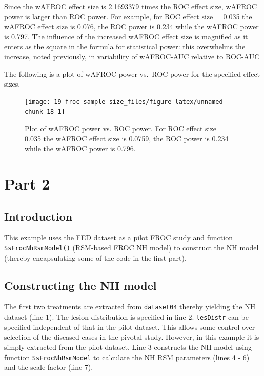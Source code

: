 \documentclass[
]{book}
\begin{document}
Since the wAFROC effect size is 2.1693379 times the ROC effect size, wAFROC power is larger than ROC power. For example, for ROC effect size = 0.035 the wAFROC effect size is 0.076, the ROC power is 0.234 while the wAFROC power is 0.797. The influence of the increased wAFROC effect size is magnified as it enters as the square in the formula for statistical power: this overwhelms the increase, noted previously, in variability of wAFROC-AUC relative to ROC-AUC

The following is a plot of wAFROC power vs.~ROC power for the specified effect sizes.

\begin{figure}

{\centering \texttt{[image: 19-froc-sample-size\_files/figure-latex/unnamed-chunk-18-1]} 

}

\caption{Plot of wAFROC power vs. ROC power. For ROC effect size = 0.035 the wAFROC effect size is 0.0759, the ROC power is 0.234 while the wAFROC power is 0.796.}\label{fig:unnamed-chunk-18}
\end{figure}

\hypertarget{part-2}{%
\section{Part 2}\label{part-2}}

\hypertarget{introduction}{%
\subsection{Introduction}\label{introduction}}

This example uses the FED dataset as a pilot FROC study and function \texttt{SsFrocNhRsmModel()} (RSM-based FROC NH model) to construct the NH model (thereby encapsulating some of the code in the first part).

\hypertarget{constructing-the-nh-model}{%
\subsection{Constructing the NH model}\label{constructing-the-nh-model}}

The first two treatments are extracted from \texttt{dataset04} thereby yielding the NH dataset (line 1). The lesion distribution is specified in line 2. \texttt{lesDistr} can be specified independent of that in the pilot dataset. This allows some control over selection of the diseased cases in the pivotal study. However, in this example it is simply extracted from the pilot dataset. Line 3 constructs the NH model using function \texttt{SsFrocNhRsmModel} to calculate the NH RSM parameters (lines 4 - 6) and the scale factor (line 7).
\end{document}
